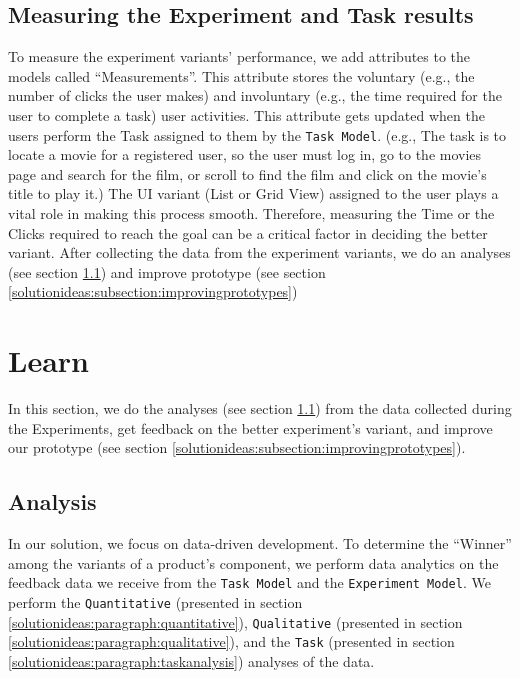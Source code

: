 \subsection{Measuring the Experiment and Task results}
\label{solutionideas:subsection:measurements}
To measure the experiment variants' performance, we add attributes to the models called ``Measurements''.
This attribute stores the voluntary (e.g., the number of clicks the user makes) and involuntary (e.g., the time required for the user to complete a task) user activities.
This attribute gets updated when the users perform the Task assigned to them by the \texttt{Task Model}.
(e.g., The task is to locate a movie for a registered user, so the user must log in, go to the movies page and search for the film, or scroll to find the film and click on the movie's title to play it.)
The UI variant (List or Grid View) assigned to the user plays a vital role in making this process smooth.
Therefore, measuring the Time or the Clicks required to reach the goal can be a critical factor in deciding the better variant.
After collecting the data from the experiment variants, we do an analyses (see section \ref{solutionideas:section:dataanalysis}) and improve prototype (see section \ref{solutionideas:subsection:improvingprototypes})

\section{Learn}
In this section, we do the analyses (see section \ref{solutionideas:section:dataanalysis}) from the data collected during the Experiments, get feedback on the better experiment's variant, and improve our prototype (see section \ref{solutionideas:subsection:improvingprototypes}).
\subsection{Analysis}
\label{solutionideas:section:dataanalysis}

In our solution, we focus on data-driven development. 
To determine the ``Winner'' among the variants of a product's component, we perform data analytics on the feedback data we receive from the \texttt{Task Model} and the \texttt{Experiment Model}.
We perform the \texttt{Quantitative} (presented in section \ref{solutionideas:paragraph:quantitative}), \texttt{Qualitative} (presented in section \ref{solutionideas:paragraph:qualitative}), and the \texttt{Task} (presented in section \ref{solutionideas:paragraph:taskanalysis}) analyses of the data.

